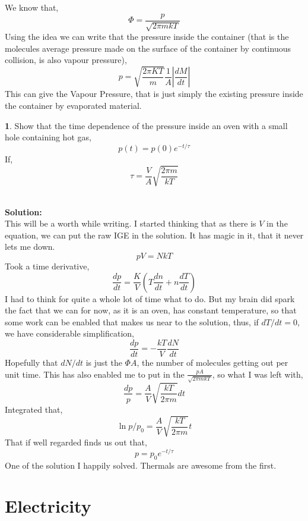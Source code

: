 \documentclass[a4paper]{article}
\theoremstyle{definition}
\newtheorem{prob}{ \framebox[0.09\textwidth]{{\sffamily Pr}} }
\newcommand{\pr}[1]{ \begin{tcolorbox} \begin{prob} 
    #1 
\end{prob} 
   \end{tcolorbox}\ 
   \\
 }
\begin{document}
We know that, \begin{equation}
\Phi = \frac{p}{\sqrt{2 \pi m kT}} 
\end{equation}
Using the idea we can write that the pressure inside the container (that is the molecules average pressure made on the surface of the container by continuous collision, is also vapour pressure),
\[ p = \sqrt{ \frac{2 \pi KT}{m} } \frac{1}{A} |\frac{dM}{dt}| \]
This can give the Vapour Pressure, that is just simply the existing pressure inside the container by evaporated material.
\pr{Show that the time dependence of the pressure inside an oven with a small hole containing hot gas, 
\[ p(t) = p(0) e^{-t/\tau} \]
If, \[\tau = \frac{V}{A} \sqrt{\frac{2 \pi m}{kT}}  \]}
\textbf{Solution:} \\ This will be a worth while writing. I started thinking that as there is $V$ in the equation, we can put the raw IGE in the solution. It has magic in it, that it never lets me down. 
\[ p V = NkT \]
Took a time derivative,
\[ \frac{dp}{dt} = \frac{K}{V} \left(T \frac{dn}{dt} + n \frac{dT}{dt} \right) \]
I had to think for quite a whole lot of time what to do. But my brain did spark the fact that we can for now, as it is an oven, has constant temperature, so that some work can be enabled that makes us near to the solution, thus, if $dT/dt = 0$, we have considerable simplification,
\[ \frac{dp}{dt} = - \frac{kT}{V} \frac{dN}{dt} \]
Hopefully that $dN/dt$ is just the $\Phi A$, the number of molecules getting out per unit time. This has also enabled me to put in the $ \frac{pA}{\sqrt{2 \pi m kT}}  $, so what I was left with,
\[ \frac{dp}{p} = \frac{A}{V} \sqrt{\frac{kT}{2 \pi m} } dt \]
Integrated that,
\[ \ln p/p_0 = \frac{A}{V} \sqrt{\frac{kT}{2 \pi m} } t \]
That if well regarded finds us out that,
\[ p = p_0 e^{-t/\tau} \]
One of the solution I happily solved. Thermals are awesome from the first.





\section{\textsf{Electricity}}
\end{document}
